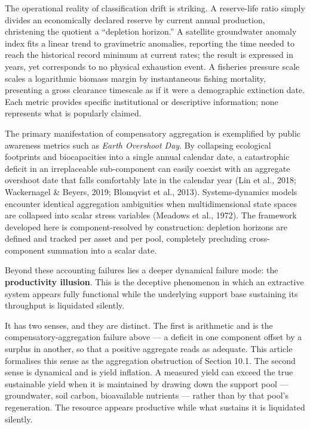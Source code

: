 \documentclass[11pt]{article}
\begin{document}
The operational reality of classification drift is striking. A reserve-life ratio simply divides an economically declared reserve by current annual production, christening the quotient a ``depletion horizon.'' A satellite groundwater anomaly index fits a linear trend to gravimetric anomalies, reporting the time needed to reach the historical record minimum at current rates; the result is expressed in years, yet corresponds to no physical exhaustion event. A fisheries pressure scale scales a logarithmic biomass margin by instantaneous fishing mortality, presenting a gross clearance timescale as if it were a demographic extinction date. Each metric provides specific institutional or descriptive information; none represents what is popularly claimed.

The primary manifestation of compensatory aggregation is exemplified by public awareness metrics such as \emph{Earth Overshoot Day}. By collapsing ecological footprints and biocapacities into a single annual calendar date, a catastrophic deficit in an irreplaceable sub-component can easily coexist with an aggregate overshoot date that falls comfortably late in the calendar year (Lin et al., 2018; Wackernagel \& Beyers, 2019; Blomqvist et al., 2013). Systems-dynamics models encounter identical aggregation ambiguities when multidimensional state spaces are collapsed into scalar stress variables (Meadows et al., 1972). The framework developed here is component-resolved by construction: depletion horizons are defined and tracked per asset and per pool, completely precluding cross-component summation into a scalar date.

Beyond these accounting failures lies a deeper dynamical failure mode: the \textbf{productivity illusion}. This is the deceptive phenomenon in which an extractive system appears fully functional while the underlying support base sustaining its throughput is liquidated silently.

It has two senses, and they are distinct. The first is arithmetic and is the compensatory-aggregation failure above --- a deficit in one component offset by a surplus in another, so that a positive aggregate reads as adequate. This article formalises this sense as the aggregation obstruction of Section 10.1. The second sense is dynamical and is yield inflation. A measured yield can exceed the true sustainable yield when it is maintained by drawing down the support pool --- groundwater, soil carbon, bioavailable nutrients --- rather than by that pool's regeneration. The resource appears productive while what sustains it is liquidated silently.
\end{document}
